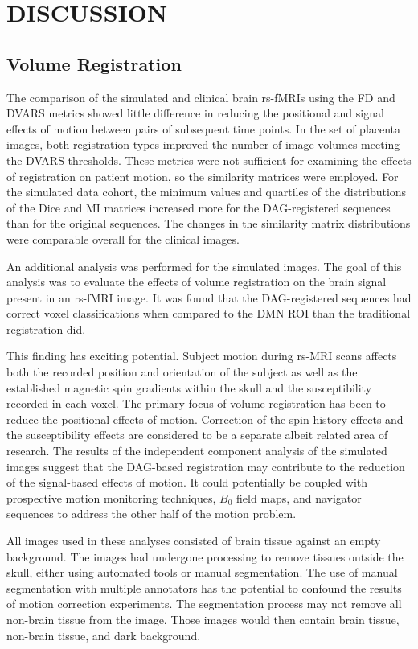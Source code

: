 \chapter{DISCUSSION}
\label{ch:discussion}

\section{Volume Registration}

The comparison of the simulated and clinical brain rs-fMRIs using the FD and DVARS metrics showed little difference in reducing the positional and signal effects of motion between pairs of subsequent time points. In the set of placenta images, both registration types improved the number of image volumes meeting the DVARS thresholds. These metrics were not sufficient for examining the effects of registration on patient motion, so the similarity matrices were employed. For the simulated data cohort, the minimum values and quartiles of the distributions of the Dice and MI matrices increased more for the DAG-registered sequences than for the original sequences. The changes in the similarity matrix distributions were comparable overall for the clinical images.

An additional analysis was performed for the simulated images. The goal of this analysis was to evaluate the effects of volume registration on the brain signal present in an rs-fMRI image. It was found that the DAG-registered sequences had correct voxel classifications when compared to the DMN ROI than the traditional registration did. 

This finding has exciting potential. Subject motion during rs-MRI scans affects both the recorded position and orientation of the subject as well as the established magnetic spin gradients within the skull and the susceptibility recorded in each voxel. The primary focus of volume registration has been to reduce the positional effects of motion. Correction of the spin history effects and the susceptibility effects are considered to be a separate albeit related area of research. The results of the independent component analysis of the simulated images suggest that the DAG-based registration may contribute to the reduction of the signal-based effects of motion. It could potentially be coupled with prospective motion monitoring techniques, $B_0$ field maps, and navigator sequences to address the other half of the motion problem.

All images used in these analyses consisted of brain tissue against an empty background. The images had undergone processing to remove tissues outside the skull, either using automated tools or manual segmentation. The use of manual segmentation with multiple annotators has the potential to confound the results of motion correction experiments. The segmentation process may not remove all non-brain tissue from the image. Those images would then contain brain tissue, non-brain tissue, and dark background. 

